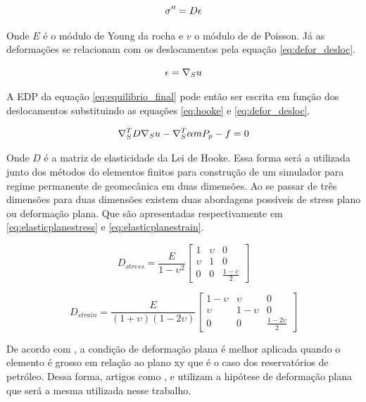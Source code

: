 \begin{equation}{
\label{eq:hooke}
\fontsize{4}{4}\selectfont
\sigma ^{\prime\prime}= D \epsilon
}
\end{equation}




Onde $E$ é o módulo de Young da rocha e $v$ o módulo de de Poisson. Já as deformações se relacionam com os deslocamentos pela equação \eqref{eq:defor_desloc}.

\begin{equation}
\label{eq:defor_desloc}
\epsilon = \nabla_S u
\end{equation}


A EDP da equação \eqref{eq:equilibrio_final} pode então ser escrita em função dos deslocamentos substituindo as equações \eqref{eq:hooke} e \eqref{eq:defor_desloc}.

\begin{equation}
\label{eq:edp_geomec}
\nabla_S^TD \nabla_S u - \nabla_S^T\alpha m P_p - f = 0
\end{equation}

Onde $D$ é a matriz de elasticidade da Lei de Hooke. Essa forma será a utilizada junto dos métodos do elementos finitos para construção de um simulador para regime permanente de geomecânica em duas dimensões. Ao se passar
de três dimensões para duas dimensões existem duas abordagens possíveis de stress plano ou deformação plana. Que são apresentadas respectivamente em \eqref{eq:elasticplanestress} e \eqref{eq:elasticplanestrain}.

\begin{equation} \label{eq:elasticplanestress}
D_{stress} = \frac{E}{1-\upsilon^2}
\begin{bmatrix}
1  & \upsilon & 0 \\ 
\upsilon & 1 &  0 \\ 
0 & 0 & \frac{1-\upsilon}{2}
\end{bmatrix}
\end{equation}

\begin{equation} \label{eq:elasticplanestrain}
D_{strain} = \frac{E}{(1+\upsilon)(1-2\upsilon)}
\begin{bmatrix}
 1-\upsilon & \upsilon    &  0 \\ 
 \upsilon   &  1-\upsilon &  0 \\ 
 0& 0 & \frac{1-2\upsilon}{2}
\end{bmatrix}
\end{equation}

De acordo com \cite{jacob}, a condição de deformação plana é melhor aplicada quando o elemento é grosso em relação ao plano xy que é o caso dos reservatórios de petróleo.  Dessa forma, artigos como \cite{planeStrainProblems}, \cite{casteletto} e \cite{irina} utilizam a hipótese de deformação plana que será a mesma utilizada nesse trabalho.

